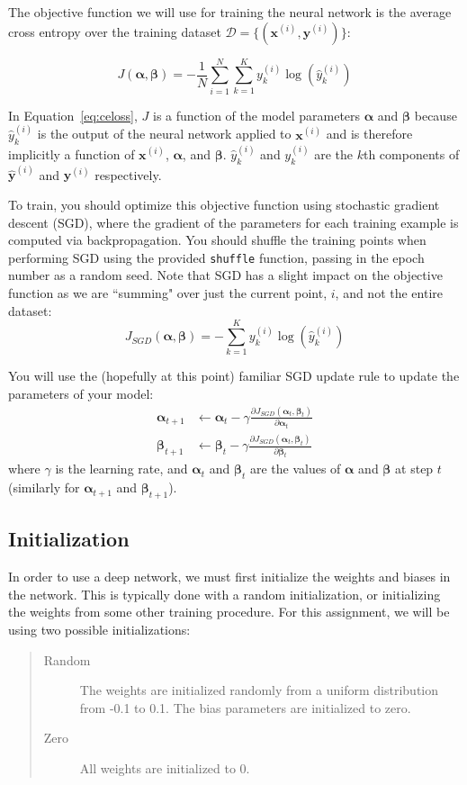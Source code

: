 \documentclass[11pt,addpoints,answers]{exam}
\newcommand{\Dc}{\mathcal{D}}
\newcommand{\xv}{\mathbf{x}}
\newcommand{\yv}{\mathbf{y}}
\newcommand{\alphav     }{\boldsymbol \alpha     }
\newcommand{\betav      }{\boldsymbol \beta      }
\begin{document}
The objective function we will use for training the neural network is the average cross entropy over the training dataset $\Dc = \{ (\xv^{(i)}, \yv^{(i)}) \}$:

\begin{equation}
\label{eq:celoss}
J(\alphav, \betav)= - \frac{1}{N} \sum_{i=1}^N \sum_{k=1}^{K} y_k^{(i)} \log (\hat{y}^{(i)}_k)
\end{equation}

In Equation~\ref{eq:celoss}, $J$ is a function of the model parameters $\alphav$ and $\betav$ because $\hat{y}^{(i)}_k$ is the output of the neural network applied to $\xv^{(i)}$ and is therefore implicitly a function of $\xv^{(i)}$, $\alphav$, and $\betav$. $\hat{y}^{(i)}_k$ and $y_k^{(i)}$ are the $k$th components of $\hat{\yv}^{(i)}$ and $\yv^{(i)}$ respectively.

To train, you should optimize this objective function using stochastic gradient descent (SGD), where the gradient of the parameters for each training example is computed via backpropagation. You should shuffle the training points when performing SGD using the provided \verb|shuffle| function, passing in the epoch number as a random seed. Note that SGD has a slight impact on the objective function as we are ``summing" over just the current point, $i$, and not the entire dataset:
\begin{equation}
\label{eq:sgd_celoss}
J_{SGD}(\alphav, \betav)= -\sum_{k=1}^{K} y_k^{(i)} \log (\hat{y}^{(i)}_k)
\end{equation}

You will use the (hopefully at this point) familiar SGD update rule to update the parameters of your model:
\begin{align}
\label{eq:sgd_update}
\alphav_{t+1} &\leftarrow \alphav_t - \gamma \frac{\partial J_{SGD}(\alphav_t, \betav_t)}{\partial \alphav_t} \\
\betav_{t+1} &\leftarrow \betav_t - \gamma \frac{\partial J_{SGD}(\alphav_t, \betav_t)}{\partial \betav_t}
\end{align}
where $\gamma$ is the learning rate, and $\alphav_t$ and $\betav_t$ are the values of $\alphav$ and $\betav$ at step $t$ (similarly for $\alphav_{t+1}$ and $\betav_{t+1}$).

\subsection{Initialization}
\label{sec:init}

In order to use a deep network, we must first initialize the weights and biases in the network. This is typically done with a random initialization, or initializing the weights from some other training procedure. For this assignment, we will be using two possible initializations: 
\begin{quote}
\begin{description}
\item[{\sc Random}] The weights are initialized randomly from a uniform distribution from -0.1 to 0.1. The bias parameters are initialized to zero.
\item[{\sc Zero}] All weights are initialized to 0.  
\end{description}
\end{quote}
\end{document}
